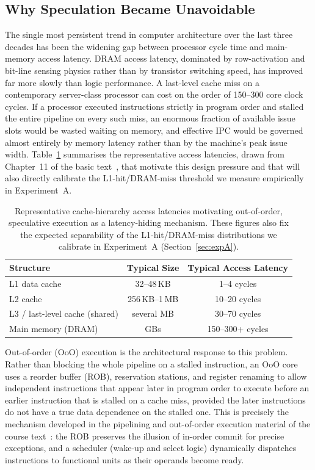 \documentclass[11pt,a4paper]{article}
\begin{document}
\subsection{Why Speculation Became Unavoidable}

The single most persistent trend in computer architecture over the last three
decades has been the widening gap between processor cycle time and main-memory
access latency. DRAM access latency, dominated by row-activation and bit-line
sensing physics rather than by transistor switching speed, has improved far more
slowly than logic performance. A last-level cache miss on a contemporary
server-class processor can cost on the order of 150--300 core clock cycles. If a
processor executed instructions strictly in program order and stalled the entire
pipeline on every such miss, an enormous fraction of available issue slots would
be wasted waiting on memory, and effective IPC would be governed almost entirely
by memory latency rather than by the machine's peak issue width.
Table~\ref{tab:latency} summarises the representative access latencies, drawn
from Chapter~11 of the basic text~\cite{sarangi2025basic}, that motivate this
design pressure and that will also directly calibrate the L1-hit/DRAM-miss
threshold we measure empirically in Experiment~A.

\begin{table}[h]
\centering
\begin{tabular}{@{}lcc@{}}
\toprule
\textbf{Structure} & \textbf{Typical Size} & \textbf{Typical Access Latency} \\
\midrule
L1 data cache & 32--48\,KB & 1--4 cycles \\
L2 cache & 256\,KB--1\,MB & 10--20 cycles \\
L3 / last-level cache (shared) & several MB & 30--70 cycles \\
Main memory (DRAM) & GBs & 150--300+ cycles \\
\bottomrule
\end{tabular}
\caption{Representative cache-hierarchy access latencies motivating
out-of-order, speculative execution as a latency-hiding mechanism. These
figures also fix the expected separability of the L1-hit/DRAM-miss
distributions we calibrate in Experiment~A (Section~\ref{sec:expA}).}
\label{tab:latency}
\end{table}

Out-of-order (OoO) execution is the architectural response to this problem.
Rather than blocking the whole pipeline on a stalled instruction, an OoO core
uses a reorder buffer (ROB), reservation stations, and register renaming to allow
independent instructions that appear later in program order to execute before an
earlier instruction that is stalled on a cache miss, provided the later
instructions do not have a true data dependence on the stalled one. This is
precisely the mechanism developed in the pipelining and out-of-order execution
material of the course text~\cite{sarangi2025basic}: the ROB preserves the
illusion of in-order commit for precise exceptions, and a scheduler (wake-up and
select logic) dynamically dispatches instructions to functional units as their
operands become ready.
\end{document}
